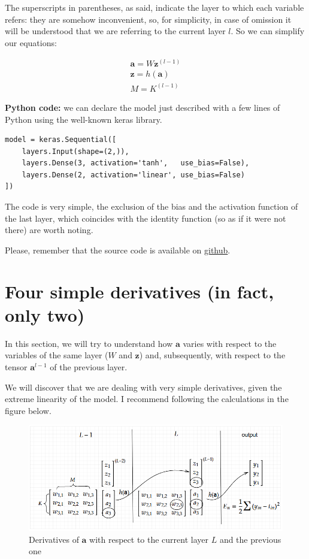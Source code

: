 \documentclass{article}
\begin{document}
The superscripts in parentheses, as said, indicate the layer to which each variable refers: they are somehow inconvenient, so, for simplicity, in case of omission it will be understood that we are referring to the current layer $\displaystyle l$. So we can simplify our equations:

\begin{gather*}
\mathbf{a} =W\mathbf{z}^{( l-1)}\\
\mathbf{z} =h(\mathbf{a})\\
M=K^{( l-1)} \ 
\end{gather*}

\textbf{Python code:} we can declare the model just described with a few lines of Python using the well-known keras library.

\begin{tcolorbox}[colback=gray!10, colframe=gray!50, title=Model definition]
\begin{verbatim}
model = keras.Sequential([
    layers.Input(shape=(2,)),
    layers.Dense(3, activation='tanh',   use_bias=False),
    layers.Dense(2, activation='linear', use_bias=False)
])
\end{verbatim}
    \end{tcolorbox}


The code is very simple, the exclusion of the bias and the activation function of the last layer, which coincides with the identity function (so as if it were not there) are worth noting.

Please, remember that the source code is available on \href{github.com/nicolinux72/backpropagation.git}{github}.

\section{Four simple derivatives (in fact, only two)}

In this section, we will try to understand how $\boldsymbol{a}$ varies with respect to the variables of the same layer ($W$ and $\boldsymbol{z}$) and, subsequently, with respect to the tensor $\boldsymbol{a}^{l-1}$ of the previous layer.

We will discover that we are dealing with very simple derivatives, given the extreme linearity of the model. I recommend following the calculations in the figure below.

\begin{figure}[H]
    \centering
    \includegraphics[width=0.8\linewidth]{images/last-layers details.png}
    \caption{Derivatives of $\boldsymbol{a}$ with respect to the current layer $L$ and the previous one}
    \label{fig:last-details}
\end{figure}
\end{document}
